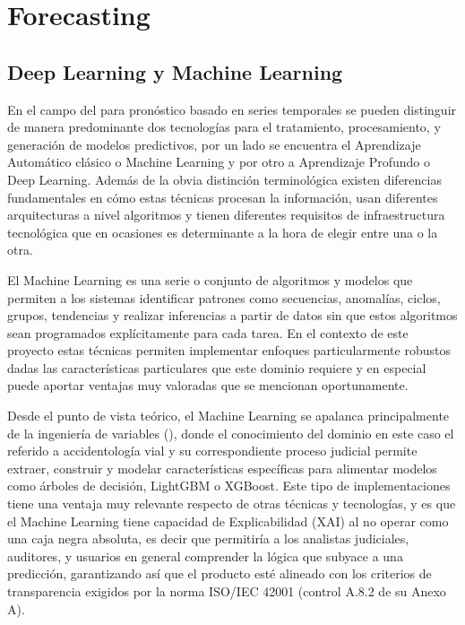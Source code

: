 \section{Forecasting}\label{forecasting}

\subsection{Deep Learning y Machine Learning}\label{deep-learning-y-machine-learning}

En el campo del  para pronóstico basado en series temporales se pueden distinguir de manera predominante dos tecnologías para el tratamiento, procesamiento, y generación de modelos predictivos, por un lado se encuentra el Aprendizaje Automático clásico o Machine Learning y por otro a Aprendizaje Profundo o Deep Learning. Además de la obvia distinción terminológica existen diferencias fundamentales en cómo estas técnicas procesan la información, usan diferentes arquitecturas a nivel algoritmos y tienen diferentes requisitos de infraestructura tecnológica que en ocasiones es determinante a la hora de elegir entre una o la otra.

El Machine Learning es una serie o conjunto de algoritmos y modelos que permiten a los sistemas identificar patrones como secuencias, anomalías, ciclos, grupos, tendencias y realizar inferencias a partir de datos sin que estos algoritmos sean programados explícitamente para cada tarea. En el contexto de este proyecto estas técnicas permiten implementar enfoques particularmente robustos dadas las características particulares que este dominio requiere y en especial puede aportar ventajas muy valoradas que se mencionan oportunamente.

Desde el punto de vista teórico, el Machine Learning se apalanca principalmente de la ingeniería de variables (), donde el conocimiento del dominio en este caso el referido a accidentología vial y su correspondiente proceso judicial permite extraer, construir y modelar características específicas para alimentar modelos como árboles de decisión, LightGBM o XGBoost. Este tipo de implementaciones tiene una ventaja muy relevante respecto de otras técnicas y tecnologías, y es que el Machine Learning tiene capacidad de Explicabilidad (XAI) al no operar como una caja negra absoluta, es decir que permitiría a los analistas judiciales, auditores, y usuarios en general comprender la lógica que subyace a una predicción, garantizando así que el producto esté alineado con los criterios de transparencia exigidos por la norma ISO/IEC 42001 (control A.8.2 de su Anexo A).

